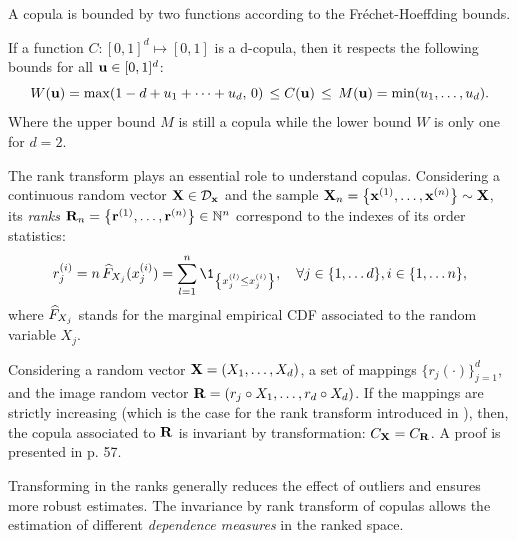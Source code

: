 A copula is bounded by two functions according to the Fréchet-Hoeffding bounds. 
\begin{theorem}
    If a function $C:[0, 1]^d \mapsto [0, 1]$ is a d-copula, then it respects the following bounds for all ${\bf u} \in [0, 1]^d$: 
    \begin{equation}
        W({\bf u}) = \max (1 - d + u_1 + \dots + u_d, \, 0) \, \leq C({\bf u}) \, \leq \, M({\bf u}) = \min(u_1,\dots ,u_d).
    \end{equation} 
    Where the upper bound $M$ is still a copula while the lower bound $W$ is only one for $d=2$.
\end{theorem}

The rank transform plays an essential role to understand copulas. 
Considering a continuous random vector ${\bf X} \in \mathcal{D}_{{\bf x}}$ and the sample ${\bf X}_n = \left\{{\bf x}^{(1)}, \dots, {\bf x}^{(n)}\right\} \sim {\bf X}$, its \textit{ranks} ${\bf R}_n = \left\{{\bf r}^{(1)}, \dots, {\bf r}^{(n)}\right\} \in \mathbb{N}^{n}$ correspond to the indexes of its order statistics: 
\begin{equation}
    r^{(i)}_j = n \, \what{F}_{X_j}(x_j^{(i)}) = \sum_{l=1}^n \1_{\left\{x^{(l)}_j \leq x^{(i)}_j\right\}}, \quad \forall j \in \{1, \dots d\}, i \in \{1, \dots n\},
    \label{eq:ranks}  
\end{equation}
where $\widehat{F}_{X_j}$ stands for the marginal empirical CDF associated to the random variable $X_j$.


\begin{theorem}
    Considering a random vector ${\bf X}=(X_1, \dots, X_d)$, a set of mappings $\{r_j (\cdot)\}_{j=1}^d$, and the image random vector ${\bf R}=(r_j \circ X_1, \dots, r_d \circ X_d)$. 
    If the mappings are strictly increasing (which is the case for the rank transform introduced in ), then, the copula associated to ${\bf R}$ is invariant by transformation: $C_{\bf X} = C_{\bf R}$. 
    A proof is presented in \citet{durante_2015_copula} p. 57.
\end{theorem}

Transforming in the ranks generally reduces the effect of outliers and ensures more robust estimates. 
The invariance by rank transform of copulas allows the estimation of different \textit{dependence measures} in the ranked space. 


